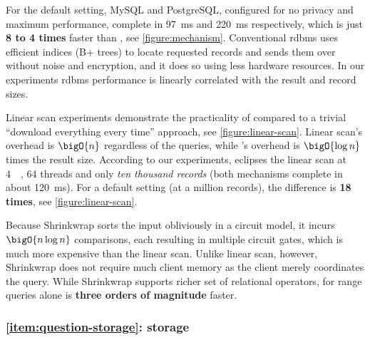 			For the default setting, MySQL and PostgreSQL, configured for no privacy and maximum performance, complete in \SI{97}{\milli\second} and \SI{220}{\milli\second} respectively, which is just \textbf{8 to 4 times} faster than \epsolute{}, see \cref{figure:mechanism}.
			Conventional \acrshort{rdbms} uses efficient indices (B+ trees) to locate requested records and sends them over without noise and encryption, and it does so using less hardware resources.
			In our experiments \acrshort{rdbms} performance is linearly correlated with the result and record sizes.

			

			Linear scan experiments demonstrate the practicality of \epsolute{} compared to a trivial ``download everything every time'' approach, see \cref{figure:linear-scan}.
			Linear scan's overhead is $\bigO{n}$ regardless of the queries, while \epsolute{}'s overhead is $\bigO{\log{n}}$ times the result size.
			According to our experiments, \epsolute{} eclipses the linear scan at \SI{4}{\kibi\byte}, 64 threads and only \emph{ten thousand records} (both mechanisms complete in about \SI{120}{\milli\second}).
			For a default setting (at a million records), the difference is \textbf{18 times}, see \cref{figure:linear-scan}.

			Because Shrinkwrap sorts the input obliviously in a circuit model, it incurs $\bigO{n \log n}$ comparisons, each resulting in multiple circuit gates, which is much more expensive than the linear scan.
			Unlike linear scan, however, Shrinkwrap does not require much client memory as the client merely coordinates the query.
			While Shrinkwrap supports richer set of relational operators, for range queries alone \epsolute{} is \textbf{three orders of magnitude} faster.

		\subsubsection*{\textbf{\texorpdfstring{\ref{item:question-storage}:}{} storage}}

			

